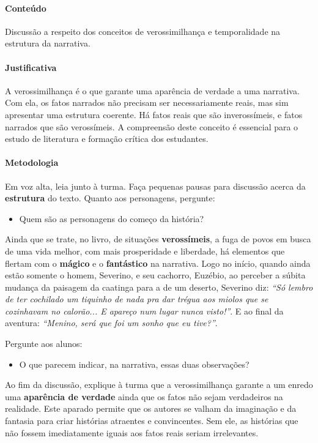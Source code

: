\documentclass[11pt]{extarticle}
\begin{document}
\paragraph{Conteúdo} Discussão a respeito dos conceitos de verossimilhança 
e temporalidade na estrutura da narrativa.

\paragraph{Justificativa} A verossimilhança é o que garante uma aparência de 
verdade a uma narrativa. Com ela, os fatos narrados não precisam ser necessariamente
reais, mas sim apresentar uma estrutura coerente. Há fatos reais que são inverossímeis,
e fatos narrados que são verossímeis. A compreensão deste conceito é essencial para
o estudo de literatura e formação crítica dos estudantes.


\paragraph{Metodologia} Em voz alta, leia junto à turma. Faça pequenas pausas para discussão 
acerca da \textbf{estrutura} do texto. Quanto aos personagens, pergunte:

\begin{itemize}
\item Quem são as personagens do começo da história? 
\end{itemize}

Ainda que se trate, no livro, de situações \textbf{verossímeis}, a fuga de povos 
em busca de uma vida melhor, com mais prosperidade e liberdade, há elementos 
que flertam com o \textbf{mágico} e o \textbf{fantástico} na narrativa. Logo no início, quando 
ainda estão somente o homem, Severino, e seu cachorro, Euzébio, ao perceber a 
súbita mudança da paisagem da caatinga para a de um deserto, Severino diz: 
\textit{``Só lembro de ter cochilado um tiquinho de nada pra dar trégua aos miolos 
que se cozinhavam no calorão... E apareço num lugar nunca visto!''}. E ao final 
da aventura: \textit{``Menino, será que foi um sonho que eu tive?''}.

Pergunte aos alunos:

\begin{itemize}
	\item O que parecem indicar, na narrativa, essas duas observações?
\end{itemize}

Ao fim da discussão, explique à turma que a verossimilhança garante 
a um enredo uma \textbf{aparência de verdade} ainda que os fatos
não sejam verdadeiros na realidade. Este aparado permite que os autores
se valham da imaginação e da fantasia para criar histórias atraentes
e convincentes. Sem ele, as histórias que não fossem imediatamente
iguais aos fatos reais seriam irrelevantes.
\end{document}
